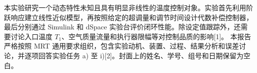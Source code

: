 本实验研究一个动态特性未知且具有明显非线性的温度控制对象。实验首先利用阶跃响应建立线性近似模型，再按照给定的超调量和调节时间设计代数补偿控制器，最后分别通过 Simulink 和 dSpace 实验台评价闭环性能。除设定值跟踪外，还需要讨论入口温度 $T_1$、空气质量流量和执行器限幅等对控制品质的影响[1]。
本报告严格按照 MRT 通用要求组织，包含实验动机、装置、过程、结果分析和误差讨论，并逐项回答实验任务 a) 至 i)[2]。封面上的姓名、学号、组号和日期保留为空白。

